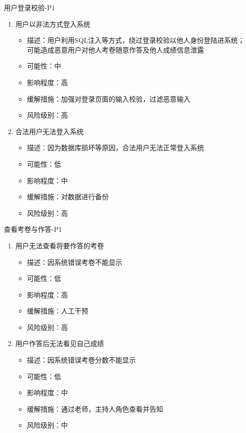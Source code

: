 \documentclass[hyperref, a4paper]{ctexart}
\providecommand{\tightlist}{%
  \setlength{\itemsep}{0pt}\setlength{\parskip}{0pt}}
\begin{document}
用户登录校验-P1

\begin{enumerate}
\def\labelenumi{\arabic{enumi}.}
\tightlist
\item
  用户以非法方式登入系统

  \begin{itemize}
  \tightlist
  \item
    描述：用户利用SQL注入等方式，绕过登录校验以他人身份登陆进系统；可能造成恶意用户对他人考卷随意作答及他人成绩信息泄露
  \item
    可能性：中
  \item
    影响程度：高
  \item
    缓解措施：加强对登录页面的输入校验，过滤恶意输入
  \item
    风险级别：高
  \end{itemize}
\item
  合法用户无法登入系统

  \begin{itemize}
  \tightlist
  \item
    描述：因为数据库损坏等原因，合法用户无法正常登入系统
  \item
    可能性：低
  \item
    影响程度：中
  \item
    缓解措施：对数据进行备份
  \item
    风险级别：高
  \end{itemize}
\end{enumerate}

查看考卷与作答-P1

\begin{enumerate}
\def\labelenumi{\arabic{enumi}.}
\tightlist
\item
  用户无法查看将要作答的考卷

  \begin{itemize}
  \tightlist
  \item
    描述：因系统错误考卷不能显示
  \item
    可能性：低
  \item
    影响程度：高
  \item
    缓解措施：人工干预
  \item
    风险级别：高
  \end{itemize}
\item
  用户作答后无法看见自己成绩

  \begin{itemize}
  \tightlist
  \item
    描述：因系统错误考卷分数不能显示
  \item
    可能性：低
  \item
    影响程度：中
  \item
    缓解措施：通过老师，主持人角色查看并告知
  \item
    风险级别：中
  \end{itemize}
\end{enumerate}
\end{document}
